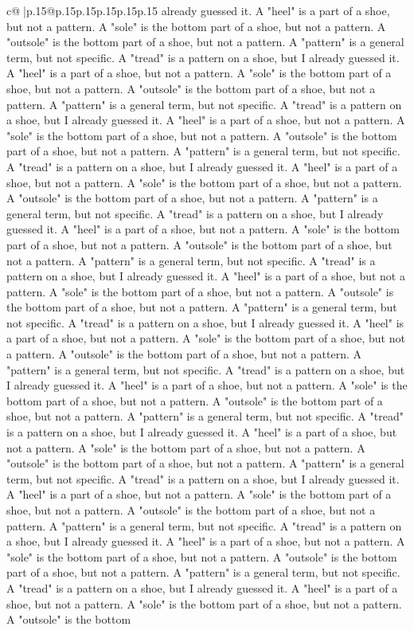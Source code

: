 \documentclass{article}
\begin{document}
{\begin{supertabular}{c@{$\;$}|p{.15\linewidth}@{}p{.15\linewidth}p{.15\linewidth}p{.15\linewidth}p{.15\linewidth}p{.15\linewidth}}
{{{already guessed it. A "heel" is a part of a shoe, but not a pattern. A "sole" is the bottom part of a shoe, but not a pattern. A "outsole" is the bottom part of a shoe, but not a pattern. A "pattern" is a general term, but not specific. A "tread" is a pattern on a shoe, but I already guessed it. A "heel" is a part of a shoe, but not a pattern. A "sole" is the bottom part of a shoe, but not a pattern. A "outsole" is the bottom part of a shoe, but not a pattern. A "pattern" is a general term, but not specific. A "tread" is a pattern on a shoe, but I already guessed it. A "heel" is a part of a shoe, but not a pattern. A "sole" is the bottom part of a shoe, but not a pattern. A "outsole" is the bottom part of a shoe, but not a pattern. A "pattern" is a general term, but not specific. A "tread" is a pattern on a shoe, but I already guessed it. A "heel" is a part of a shoe, but not a pattern. A "sole" is the bottom part of a shoe, but not a pattern. A "outsole" is the bottom part of a shoe, but not a pattern. A "pattern" is a general term, but not specific. A "tread" is a pattern on a shoe, but I already guessed it. A "heel" is a part of a shoe, but not a pattern. A "sole" is the bottom part of a shoe, but not a pattern. A "outsole" is the bottom part of a shoe, but not a pattern. A "pattern" is a general term, but not specific. A "tread" is a pattern on a shoe, but I already guessed it. A "heel" is a part of a shoe, but not a pattern. A "sole" is the bottom part of a shoe, but not a pattern. A "outsole" is the bottom part of a shoe, but not a pattern. A "pattern" is a general term, but not specific. A "tread" is a pattern on a shoe, but I already guessed it. A "heel" is a part of a shoe, but not a pattern. A "sole" is the bottom part of a shoe, but not a pattern. A "outsole" is the bottom part of a shoe, but not a pattern. A "pattern" is a general term, but not specific. A "tread" is a pattern on a shoe, but I already guessed it. A "heel" is a part of a shoe, but not a pattern. A "sole" is the bottom part of a shoe, but not a pattern. A "outsole" is the bottom part of a shoe, but not a pattern. A "pattern" is a general term, but not specific. A "tread" is a pattern on a shoe, but I already guessed it. A "heel" is a part of a shoe, but not a pattern. A "sole" is the bottom part of a shoe, but not a pattern. A "outsole" is the bottom part of a shoe, but not a pattern. A "pattern" is a general term, but not specific. A "tread" is a pattern on a shoe, but I already guessed it. A "heel" is a part of a shoe, but not a pattern. A "sole" is the bottom part of a shoe, but not a pattern. A "outsole" is the bottom part of a shoe, but not a pattern. A "pattern" is a general term, but not specific. A "tread" is a pattern on a shoe, but I already guessed it. A "heel" is a part of a shoe, but not a pattern. A "sole" is the bottom part of a shoe, but not a pattern. A "outsole" is the bottom part of a shoe, but not a pattern. A "pattern" is a general term, but not specific. A "tread" is a pattern on a shoe, but I already guessed it. A "heel" is a part of a shoe, but not a pattern. A "sole" is the bottom part of a shoe, but not a pattern. A "outsole" is the bottom }}}
\end{supertabular}}
\end{document}
